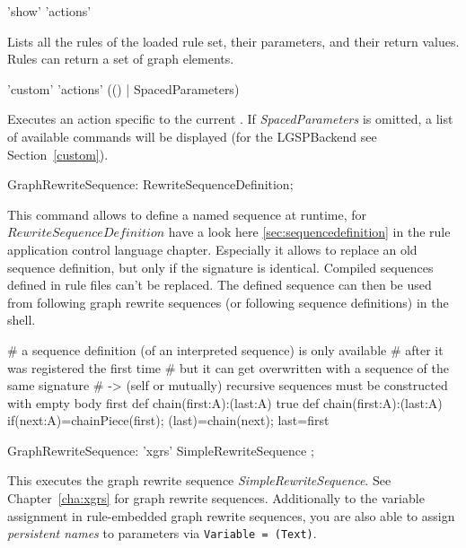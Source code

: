 \begin{rail}
  'show' 'actions'
\end{rail}
Lists all the rules of the loaded rule set, their parameters, and their return values.
Rules can return a set of graph elements.

\begin{rail}
  'custom' 'actions' (() | SpacedParameters)
\end{rail}
Executes an action specific to the current . 
If \emph{SpacedParameters} is omitted, a list of available commands will be displayed (for the LGSPBackend see Section~\ref{custom}).

\begin{rail}
  GraphRewriteSequence: RewriteSequenceDefinition;
\end{rail}
This command allows to define a named sequence at runtime, for $RewriteSequenceDefinition$ have a look here  \ref{sec:sequencedefinition} in the rule application control language chapter.
Especially it allows to replace an old sequence definition, but only if the signature is identical.
Compiled sequences defined in rule files can't be replaced.
The defined sequence can then be used from following graph rewrite sequences (or following sequence definitions) in the shell. 

\begin{example}
\begin{grgen}
# a sequence definition (of an interpreted sequence) is only available
# after it was registered the first time
# but it can get overwritten with a sequence of the same signature
# -> (self or mutually) recursive sequences must be constructed with empty body first
def chain(first:A):(last:A){ true }
def chain(first:A):(last:A){ if{(next:A)=chainPiece(first); (last)=chain(next); last=first} } 
\end{grgen}
\end{example}

\makeatletter
\begin{rail}
  GraphRewriteSequence: 'xgrs' SimpleRewriteSequence ;
\end{rail}
This executes the graph rewrite sequence \emph{SimpleRewriteSequence}.
See Chapter~\ref{cha:xgrs} for graph rewrite sequences.
Additionally to the variable assignment in rule-embedded graph rewrite sequences, you are also able to assign \emph{persistent names} to parameters via  \texttt{Variable = \@(Text)}.

